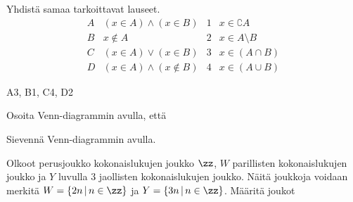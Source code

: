 \begin{tehtavasivu}
\begin{tehtava}
    \begin{vastaus}
    
        \alakohdat{
            § $[3,5]$
            § $[1,6]$
            § $[1,3[$
            § $]-\infty,1[ \ \cup \ ]5,\infty[$
        }
    \end{vastaus}
    
\end{tehtava}

\begin{tehtava}
     Yhdistä samaa tarkoittavat lauseet.
\[
\begin{array}{llll}
A & (x\in A)\land (x\in B) & 1 & x\in \complement A \\
B & x\notin A & 2 & x \in A\setminus B \\
C & (x\in A)\lor (x\in B) & 3 & x\in (A\cap B) \\
D & (x\in A)\land (x\notin B) & 4 & x\in (A\cup B)
\end{array}
\]

    \begin{vastaus}
    A3, B1, C4, D2
    \end{vastaus}
    
\end{tehtava}


\begin{tehtava}
     Osoita Venn-diagrammin avulla, että

%    
    
\end{tehtava}

\begin{tehtava}
     Sievennä Venn-diagrammin avulla.

    \begin{vastaus}
    
    \end{vastaus}
    
\end{tehtava}

\begin{tehtava}
  Olkoot perusjoukko kokonaislukujen joukko $\zz$, $W$ parillisten kokonaislukujen joukko ja $Y$ luvulla $3$ jaollisten kokonaislukujen joukko. Näitä joukkoja voidaan merkitä $W = \{2n\,|\, n\in\zz\}$ ja $Y = \{3n \,|\, n \in \zz\}$. Määritä joukot   


\end{tehtava}
\end{tehtavasivu}
